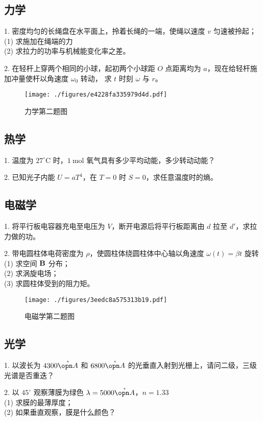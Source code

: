 \subsection{力学}
1. 密度均匀的长绳盘在水平面上，拎着长绳的一端，使绳以速度 $v$ 匀速被拎起；\\
(1) 求施加在绳端的力\\
(2) 求拉力的功率与机械能变化率之差。

2. 在轻杆上穿两个相同的小球，起初两个小球距 $O$ 点距离均为 $a$，现在给轻杆施加冲量使杆以角速度 $\omega_{0}$ 转动， 求 $t$ 时刻 $\omega$ 与 $r$。
\begin{figure}[ht]
\centering
\texttt{[image: ./figures/e4228fa335979d4d.pdf]}
\caption{力学第二题图} \label{fig_NJU15_1}
\end{figure}
\subsection{热学}
1. 温度为 $27^{\circ} \mathrm{C}$ 时，$1 \mathrm{~mol}$ 氧气具有多少平均动能，多少转动动能？

2. 已知光子内能 $U=a T^{4}$，在 $T=0$ 时 $S=0$，求任意温度时的熵。
\subsection{电磁学}
1. 将平行板电容器充电至电压为 $V$，断开电源后将平行板距离由 $d$ 拉至 $d'$，求拉力做的功。

2. 带电圆柱体电荷密度为 $\rho$，使圆柱体绕圆柱体中心轴以角速度 $\omega(t)=\beta t$ 旋转\\
(1) 求空间 $\bf{B}$ 分布；\\
(2) 求涡旋电场；\\
(3) 求圆柱体受到的阻力矩。
\begin{figure}[ht]
\centering
\texttt{[image: ./figures/3eedc8a575313b19.pdf]}
\caption{电磁学第二题图} \label{fig_NJU15_2}
\end{figure}
\subsection{光学}
1. 以波长为 $4300 \mathring{\opn A}$ 和 $6800 \mathring{\opn A}$ 的光垂直入射到光栅上，请问二级，三级光谱是否重迭？

2. 以 $45^{\circ}$ 观察薄膜为绿色 $\lambda=5000 \mathring{\opn A}$，$n=1.33$\\
(1) 求膜的最薄厚度；\\
(2) 如果垂直观察，膜是什么颜色？
